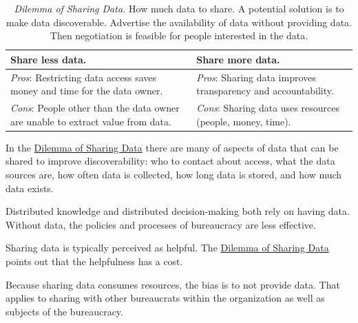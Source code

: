 \begin{center}
\begin{table}[H] %
\begin{tabular}{ | m{\dilemmatablewidth}| m{\dilemmatablewidth} | } 
  \hline
  \textbf{Share less data.} &
  \textbf{Share more data.} \\
  \hline
  \textit{Pros}: Restricting data access saves money and time for the data owner.&
  \textit{Pros}: Sharing data improves transparency and accountability. \\
  \hline
  \textit{Cons}: People other than the data owner are unable to extract value from data. & 
  \textit{Cons}: Sharing data uses resources (people, money, time). \\
  \hline
\end{tabular}
\caption{
\textit{Dilemma of Sharing Data.}
How much data to share. A potential solution is to make data discoverable. Advertise the availability of data without providing data. Then negotiation is feasible for people interested in the data.
}
\label{table:dilemma-data-share-vs-hide}
\end{table}
\end{center}

In the \hyperref[table:dilemma-data-share-vs-hide]{Dilemma of Sharing Data} there are many of aspects of data that can be shared to improve discoverability: who to contact about access, what the data sources are, how often data is collected, how long data is stored, and how much data exists.

Distributed knowledge and distributed decision-making both rely on having data. Without data, the policies and processes of bureaucracy are less effective. 

Sharing data is typically perceived as helpful. 
The \hyperref[table:dilemma-data-share-vs-hide]{Dilemma of Sharing Data} points out that the helpfulness has a cost. 

Because sharing data consumes resources, the bias is to not provide data. That applies to sharing with other bureaucrats within the organization as well as subjects of the bureaucracy. 


